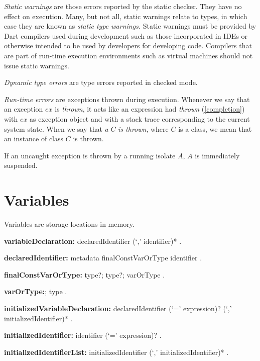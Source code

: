 \documentclass{article}
\begin{document}
\LMHash{}
{\em Static  warnings} are those errors reported by the static checker. They have no effect on execution. Many, but not all, static warnings relate to types, in which case they are known as {\em static type warnings.} Static warnings must be provided by Dart compilers used during development such as those incorporated in IDEs or otherwise intended to be used by developers for developing code. Compilers that are part of run-time execution environments such as virtual machines should not issue static warnings.

\LMHash{}
{\em Dynamic type errors} are type errors reported in checked mode.

\LMHash{}
{\em Run-time errors} are exceptions thrown during execution. Whenever we say that an exception $ex$ is {\em thrown}, it acts like an expression had {\em thrown} (\ref{completion}) with $ex$ as exception object and with a stack trace corresponding to the current system state. When we say that {\em a} $C$ {\em is thrown}, where $C$ is a class, we mean that an instance of class $C$ is thrown.

\LMHash{}
If an uncaught exception is thrown by a running isolate $A$, $A$ is immediately suspended.

\section{Variables}

\LMHash{}
Variables are storage locations in memory.

\begin{grammar}
{\bf variableDeclaration:}
      declaredIdentifier (`,' identifier)*
    .

{\bf declaredIdentifier:}
      metadata finalConstVarOrType identifier
    .

{\bf finalConstVarOrType:}\FINAL{} type?;
      \CONST{} type?;
      varOrType
    .

{\bf varOrType:}\VAR{};
      type
    .

{\bf initializedVariableDeclaration:}
      declaredIdentifier (`=' expression)? (`,' initializedIdentifier)* %
    .

{\bf initializedIdentifier:}
      identifier (`=' expression)? %
    .

{\bf initializedIdentifierList:}
      initializedIdentifier (`,' initializedIdentifier)*
    .
\end{grammar}
\end{document}
